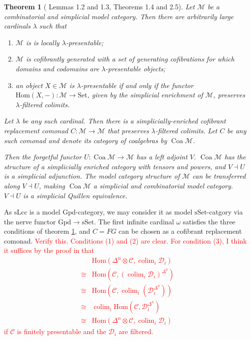 \documentclass{article}
\newcommand{\todo}[1]{\textcolor{red}{#1}}
\newtheorem{theorem}{Theorem}
\theoremstyle{remark}
\theoremstyle{definition}
\begin{document}
\begin{theorem}[\cite{coalgebraic-models} Lemmas 1.2 and 1.3, Theorems 1.4 and 2.5]
  \label{th:coalgebraic-model-category}
  Let $\mathcal{M}$ be a combinatorial and simplicial model category.
  Then there are arbitrarily large cardinals $\lambda$ such that
  \begin{enumerate}
    \item
      $\mathcal{M}$ is is locally $\lambda$-presentable;
    \item
      $\mathcal{M}$ is cofibrantly generated with a set of generating cofibrations for which domains and codomains are $\lambda$-presentable objects;
    \item
      an object $X \in \mathcal{M}$ is $\lambda$-presentable if and only if the functor $\mathrm{Hom}(X, -) : \mathcal{M} \rightarrow \mathrm{Set}$, given by the simplicial enrichment of $\mathcal{M}$, preserves $\lambda$-filtered colimits.
  \end{enumerate}

  Let $\lambda$ be any such cardinal.
  Then there is a simplicially-enriched cofibrant replacement comonad $C : \mathcal{M} \rightarrow \mathcal{M}$ that preserves $\lambda$-filtered colimits. 
  Let $C$ be any such comonad and denote its category of coalgebras by $\operatorname{Coa} \mathcal{M}$.

  Then the forgetful functor $U : \operatorname{Coa} \mathcal{M} \rightarrow \mathcal{M}$ has a left adjoint $V$.
  $\operatorname{Coa} \mathcal{M}$ has the structure of a simplicially enriched category with tensors and powers, and $V \dashv U$ is a simplicial adjunction.
  The model category structure of $\mathcal{M}$ can be transferred along $V \dashv U$, making $\operatorname{Coa} \mathcal{M}$ a simplicial and combinatorial model category.
  $V \dashv U$ is a simplicial Quillen equivalence.
\end{theorem}

As $\mathrm{sLcc}$ is a model $\mathrm{Gpd}$-category, we may consider it as model $\mathrm{sSet}$-catgory via the nerve functor $\mathrm{Gpd} \rightarrow \mathrm{sSet}$.
The first infinite cardinal $\omega$ satisfies the three conditions of theorem \ref{th:coalgebraic-model-category}, and $C = FG$ can be chosen as a cofibrant replacement comonad.
\todo{
  Verify this.
  Conditions (1) and (2) are clear.
  For condition (3), I think it suffices by the proof in \cite{coalgebraic-models} that
  \begin{align}
    & \mathrm{Hom}(\Delta^n \otimes \mathcal{C}, \operatorname{colim}_i \mathcal{D}_i) \\
    \cong {} & \mathrm{Hom}(\mathcal{C}, (\operatorname{colim}_i \mathcal{D}_i)^{\Delta^n}) \\
    \cong {} & \mathrm{Hom}(\mathcal{C}, \operatorname{colim}_i (\mathcal{D}_i^{\Delta^n})) \\
    \cong {} & \operatorname{colim}_i \mathrm{Hom}(\mathcal{C}, \mathcal{D}_i^{\Delta^n}) \\
    \cong {} & \mathrm{Hom}(\Delta^n \otimes \mathcal{C}, \operatorname{colim}_i \mathcal{D}_i) 
  \end{align}
  if $\mathcal{C}$ is finitely presentable and the $\mathcal{D}_i$ are filtered.
}
\end{document}
